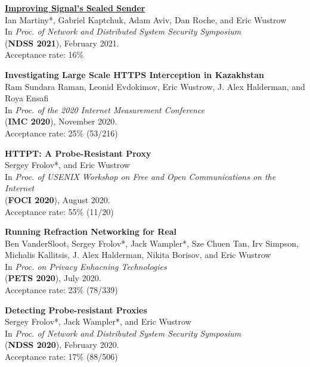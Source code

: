 \documentclass[margin,11pt]{res} %
\begin{document}
    \textbf{\href{https://www.ndss-symposium.org/ndss-paper/improving-signals-sealed-sender/}{Improving Signal's Sealed Sender}} \\
    Ian Martiny*, Gabriel Kaptchuk, Adam Aviv, Dan Roche, and Eric Wustrow \\
    In \emph{Proc. of Network and Distributed System Security Symposium} \\
    (\textbf{NDSS 2021}), February 2021. \\
    Acceptance rate: 16\% %

    \textbf{Investigating Large Scale HTTPS Interception in Kazakhstan} \\
    Ram Sundara Raman, Leonid Evdokimov, Eric Wustrow, J. Alex Halderman, and Roya Ensafi \\
    In \emph{Proc. of the 2020 Internet Measurement Conference} \\
    (\textbf{IMC 2020}), November 2020. \\
    Acceptance rate: 25\% (53/216)

    \textbf{HTTPT: A Probe-Resistant Proxy} \\
    Sergey Frolov*, and Eric Wustrow \\
    In \emph{Proc. of USENIX Workshop on Free and Open Communications on the Internet} \\
    (\textbf{FOCI 2020}), August 2020. \\
    Acceptance rate: 55\% (11/20)

    \textbf{Running Refraction Networking for Real} \\
    Ben VanderSloot, Sergey Frolov*, Jack Wampler*, Sze Chuen Tan, Irv Simpson, Michalis Kallitsis, J. Alex Halderman, Nikita Borisov, and Eric Wustrow \\
    In \emph{Proc. on Privacy Enhacning Technologies} \\
    (\textbf{PETS 2020}), July 2020. \\
    Acceptance rate: 23\% (78/339)   %

    \textbf{Detecting Probe-resistant Proxies} \\
    Sergey Frolov*, Jack Wampler*, and Eric Wustrow \\
    In \emph{Proc. of Network and Distributed System Security Symposium} \\
    (\textbf{NDSS 2020}), February 2020. \\
    Acceptance rate: 17\% (88/506)
\end{document}
